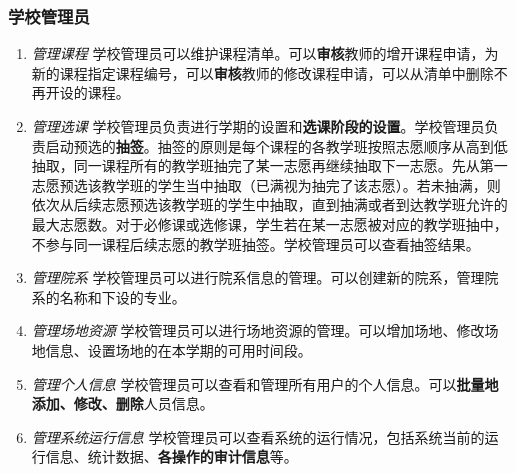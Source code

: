 \subsubsection{学校管理员}
\begin{enumerate}
    \item \textit{管理课程} \quad 学校管理员可以维护课程清单。可以\textbf{审核}教师的增开课程申请，为新的课程指定课程编号，可以\textbf{审核}教师的修改课程申请，可以从清单中删除不再开设的课程。
    \item \textit{管理选课} \quad 学校管理员负责进行学期的设置和\textbf{选课阶段的设置}。学校管理员负责启动预选的\textbf{抽签}。抽签的原则是每个课程的各教学班按照志愿顺序从高到低抽取，同一课程所有的教学班抽完了某一志愿再继续抽取下一志愿。先从第一志愿预选该教学班的学生当中抽取（已满视为抽完了该志愿）。若未抽满，则依次从后续志愿预选该教学班的学生中抽取，直到抽满或者到达教学班允许的最大志愿数。对于必修课或选修课，学生若在某一志愿被对应的教学班抽中，不参与同一课程后续志愿的教学班抽签。学校管理员可以查看抽签结果。
    \item \textit{管理院系} \quad 学校管理员可以进行院系信息的管理。可以创建新的院系，管理院系的名称和下设的专业。
    \item \textit{管理场地资源} \quad 学校管理员可以进行场地资源的管理。可以增加场地、修改场地信息、设置场地的在本学期的可用时间段。
    \item \textit{管理个人信息} \quad 学校管理员可以查看和管理所有用户的个人信息。可以\textbf{批量地添加、修改、删除}人员信息。
    \item \textit{管理系统运行信息} \quad 学校管理员可以查看系统的运行情况，包括系统当前的运行信息、统计数据、\textbf{各操作的审计信息}等。
\end{enumerate}
